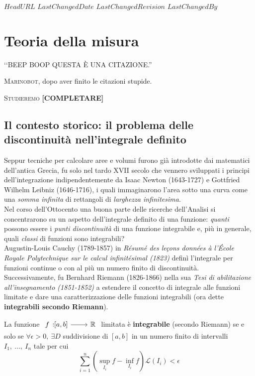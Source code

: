 \svnidlong
{$HeadURL$}
{$LastChangedDate$}
{$LastChangedRevision$}
{$LastChangedBy$}

\chapter{Teoria della misura}

\begin{introduction}
	‘‘BEEP BOOP QUESTA È UNA CITAZIONE.''
\begin{flushright}
	\textsc{Marinobot,} dopo aver finito le citazioni stupide.
\end{flushright}
\end{introduction}
\lettrine[findent=1pt, nindent=0pt]{S}{tudieremo} \textbf{[COMPLETARE]}
\section{Il contesto storico: il problema delle discontinuità nell'integrale definito}
Seppur tecniche per calcolare aree e volumi furono già introdotte dai matematici dell'antica Grecia, fu solo nel tardo XVII secolo che vennero sviluppati i principi dell'integrazione indipendentemente da Isaac Newton (1643-1727) e Gottfried Wilhelm Leibniz (1646-1716), i quali immaginarono l'area sotto una curva come una \textit{somma infinita} di rettangoli di \textit{larghezza infinitesima}.\\
Nel corso dell'Ottocento una buona parte delle ricerche dell'Analisi si concentrarono su un aspetto dell'integrale definito di una funzione: \textit{quanti} possono essere i \textit{punti discontinuità} di una funzione
integrabile e, più in generale, quali \textit{classi} di funzioni sono integrabili?\\
Augustin-Louis Cauchy (1789-1857) in \textit{Résumé des leçons données à	l’École Royale Polytechnique sur le calcul infinitésimal (1823)} definì l'integrale per funzioni continue o con al più un numero finito di discontinuità.\\
Successivamente, fu Bernhard Riemann (1826-1866) nella sua \textit{Tesi di abilitazione all'insegnamento (1851-1852)} a estendere il concetto di integrale alle funzioni limitate e dare una caratterizzazione delle funzioni integrabili (ora dette \textbf{integrabili secondo Riemann}).
\begin{define}
La funzione $\funz{f}{\left[a,b\right]}{\realset}$ limitata è \textbf{integrabile} (secondo Riemann) se e solo se $\forall \epsilon>0,\ \exists D$ suddivisione di $\left[a,b\right]$ in un numero finito di intervalli $I_1,\ \ldots,\ I_n$ tale per cui
\begin{equation}
	\sum_{i=1}^{n}\left(\sup_{I_i}f-\inf_{I_i}f\right)\mathcal{L}\left(I_i\right)<\epsilon
\end{equation}
\end{define}
